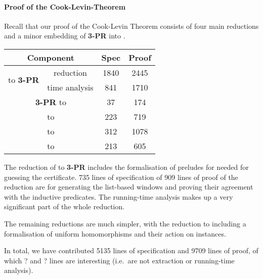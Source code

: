 \paragraph{Proof of the Cook-Levin-Theorem}
Recall that our proof of the Cook-Levin Theorem consists of four main reductions and a minor embedding of \textbf{3-PR} into \PR{}.

\begin{center}
  \begin{tabular}{cccc}
    \multicolumn{2}{c}{Component} & Spec & Proof \\
    \midrule
    \multirow{2}{*}{\gennp{} to \textbf{3-PR}} & reduction & 1840 & 2445 \\
                                               & time analysis & 841 & 1710 \\
    \multicolumn{2}{c}{\textbf{3-PR} to \PR{}} & 37 & 174 \\
    \multicolumn{2}{c}{\PR{} to \BPR{}} & 223 & 719 \\
    \multicolumn{2}{c}{\BPR{} to \fsat{}} & 312 & 1078 \\
    \multicolumn{2}{c}{\fsat{} to \SAT{}} & 213 & 605 
  \end{tabular}
\end{center}

The reduction of \gennp{} to \textbf{3-PR} includes the formalisation of preludes for \PR{} needed for guessing the certificate. 735 lines of specification of 909 lines of proof of the reduction are for generating the list-based windows and proving their agreement with the inductive predicates. 
The running-time analysis makes up a very significant part of the whole reduction. 

The remaining reductions are much simpler, with the reduction to \BPR{} including a formalisation of uniform homomorphisms and their action on \PR{} instances.

In total, we have contributed 5135 lines of specification and 9709 lines of proof, of which ? and ? lines are interesting (i.e.\ are not extraction or running-time analysis). 
